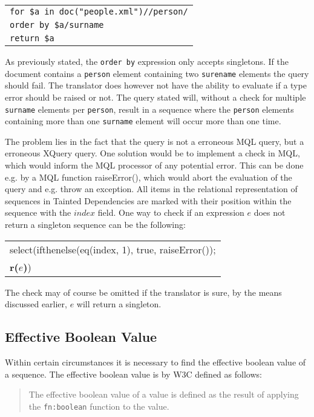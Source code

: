 \begin{center}
\begin{tabular}{l}
\texttt{for \$a in doc("people.xml")//person/} \\
\texttt{order by \$a/surname} \\
\texttt{return \$a}
\end{tabular}
\end{center}

As previously stated, the \texttt{order by} expression only accepts singletons. If the document contains a
\texttt{person} element containing two \texttt{surename} elements the query should fail. The translator does
however not have the ability to evaluate if a type error should be raised or not. The query stated will, without a
check for multiple \texttt{surname} elements per \texttt{person}, result in a sequence where the \texttt{person}
elements containing more than one \texttt{surname} element will occur more than one time. 

The problem lies in the fact that the query is not a erroneous MQL query, but a erroneous XQuery query. One
solution would be to implement a check in MQL, which would inform the MQL processor of any potential error. This
can be done e.g. by a MQL function \textsf{raiseError()}, which would abort the evaluation of the query and e.g.
throw an exception. All items in the relational representation of sequences in Tainted Dependencies are marked
with their position within the sequence with the $index$ field. One way to check if an expression $e$ does not
return a singleton sequence can be the following:
\begin{center}
\begin{tabular}{l}
\textsf{select(ifthenelse(eq(index, 1), true, raiseError());} \\ \quad
\textbf{r(}$e$\textbf{)}\textsf{)}
\end{tabular}
\end{center}

The check may of course be omitted if the translator is sure, by the means discussed earlier, $e$ will return a
singleton.

\subsection{Effective Boolean Value}
\label{sect:disc:effBool}
Within certain circumstances it is necessary to find the effective boolean value
of a sequence. The effective boolean value is by W3C defined as follows\cite{w3c00}: 
\begin{quote}
The effective boolean value of a value is defined as the result of applying the \texttt{fn:boolean} function to
the value.
\end{quote}

